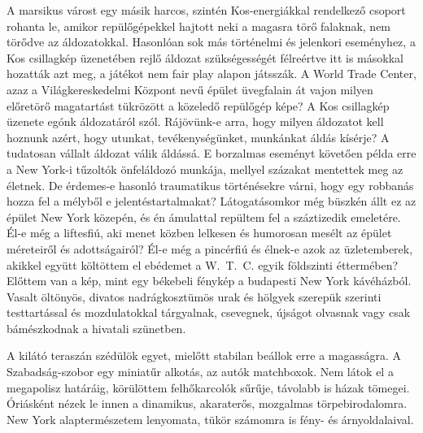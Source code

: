 A marsikus várost egy másik harcos, szintén Kos-energiákkal rendelkező
csoport rohanta le, amikor repülőgépekkel hajtott neki a magasra
törő falaknak, nem törődve az áldozatokkal. Hasonlóan sok más
történelmi és jelenkori eseményhez, a Kos csillagkép üzenetében rejlő
áldozat szükségességét félreértve itt is másokkal hozatták azt meg,
a játékot nem fair play alapon játsszák. A World Trade Center, azaz
a Világkereskedelmi Központ nevű épület üvegfalain át vajon milyen
előretörő magatartást tükrözött a közeledő repülőgép képe? A Kos
csillagkép üzenete egónk áldozatáról szól. Rájövünk-e arra, hogy milyen
áldozatot kell hoznunk azért, hogy utunkat, tevékenységünket,
munkánkat áldás kísérje? A tudatosan vállalt áldozat válik áldássá.
E borzalmas eseményt követően példa erre a New York-i tűzoltók
önfeláldozó munkája, mellyel százakat mentettek meg az életnek. De
érdemes-e hasonló traumatikus történésekre várni, hogy egy robbanás
hozza fel a mélyből e jelentéstartalmakat? Látogatásomkor még büszkén
állt ez az épület New York közepén, és én ámulattal repültem fel a
száztizedik emeletére. Él-e még a liftesfiú, aki menet közben lelkesen
és humorosan mesélt az épület méreteiről és adottságairól? Él-e még a
pincérfiú és élnek-e azok az üzletemberek, akikkel együtt költöttem el
ebédemet a W.~T.~C. egyik földszinti éttermében? Előttem van a kép,
mint egy békebeli fénykép a budapesti New York kávéházból. Vasalt
öltönyös, divatos nadrágkosztümös urak és hölgyek szerepük szerinti
testtartással és mozdulatokkal tárgyalnak, csevegnek, újságot olvasnak
vagy csak bámészkodnak a hivatali szünetben.

A kilátó teraszán szédülök egyet, mielőtt stabilan beállok erre a magasságra.
A Szabadság-szobor egy miniatűr alkotás, az autók matchboxok.
Nem látok el a megapolisz határáig, körülöttem felhőkarcolók
sűrűje, távolabb is házak tömegei. Óriásként nézek le innen a dinamikus,
akaraterős, mozgalmas törpebirodalomra. New York alaptermészetem
lenyomata, tükör számomra is fény- és árnyoldalaival.

